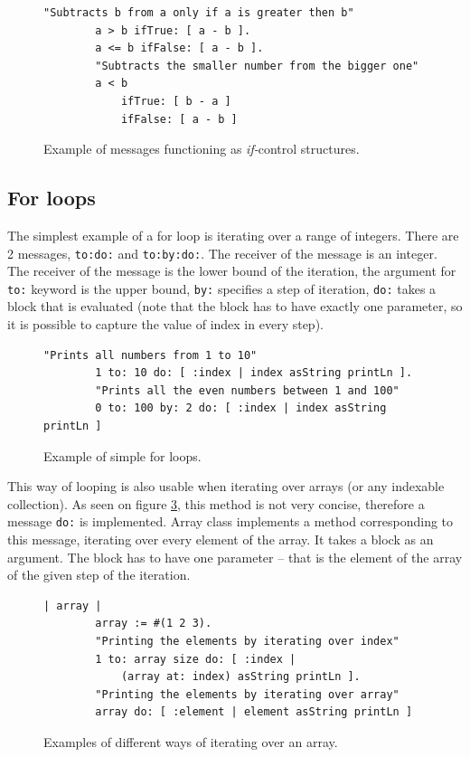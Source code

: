 \documentclass[thesis=M,english]{FITthesis}[2019/12/23]
\begin{document}
\begin{figure}[h!]
	\begin{lstlisting}[language=Smalltalk]
		"Subtracts b from a only if a is greater then b"
		a > b ifTrue: [ a - b ].
		a <= b ifFalse: [ a - b ].
		"Subtracts the smaller number from the bigger one"
		a < b
			ifTrue: [ b - a ]
			ifFalse: [ a - b ]
	\end{lstlisting}
	\caption{Example of messages functioning as \textit{if-}control structures.}
	\label{lst-if-control}
\end{figure}

\subsection{For loops}
The simplest example of a for loop is iterating over a range of integers. There are 2 messages, \texttt{to:do:} and  \texttt{to:by:do:}.
The receiver of the message is an integer. The receiver of the message is the lower bound of the iteration, the argument for \texttt{to:}
keyword is the upper bound, \texttt{by:} specifies a step of iteration, \texttt{do:} takes a block that is evaluated (note that the block
has to have exactly one parameter, so it is possible to capture the value of index in every step).

\begin{figure}[h!]
	\begin{lstlisting}[language=Smalltalk]
		"Prints all numbers from 1 to 10"
		1 to: 10 do: [ :index | index asString printLn ].
		"Prints all the even numbers between 1 and 100"
		0 to: 100 by: 2 do: [ :index | index asString printLn ]
	\end{lstlisting}
	\caption{Example of simple for loops.}
	\label{lst-for-index}
\end{figure}

This way of looping is also usable when iterating over arrays (or any indexable collection). As seen on figure \ref{lst-for-array}, this method is not
very concise, therefore a message \texttt{do:} is implemented. Array class implements a method corresponding to this message, iterating
over every element of the array. It takes a block as an argument. The block has to have one parameter -- that is the element of the array
of the given step of the iteration.

\begin{figure}[h!]
	\begin{lstlisting}[language=Smalltalk]
		| array |
		array := #(1 2 3).
		"Printing the elements by iterating over index"
		1 to: array size do: [ :index |
			(array at: index) asString printLn ].
		"Printing the elements by iterating over array"
		array do: [ :element | element asString printLn ]
	\end{lstlisting}
	\caption{Examples of different ways of iterating over an array.}
	\label{lst-for-array}
\end{figure}
\end{document}
